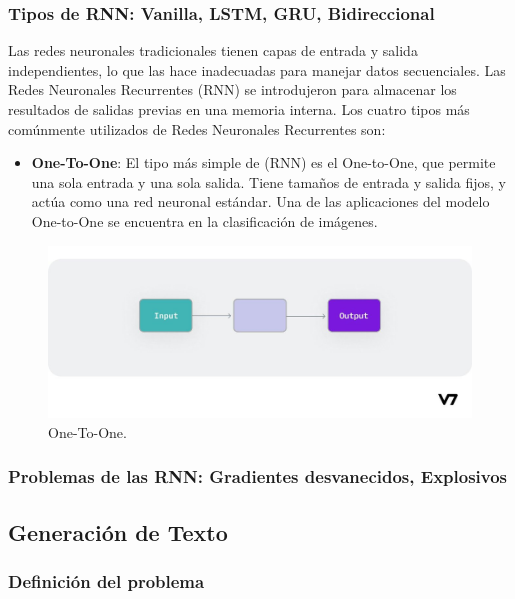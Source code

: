 \documentclass{article}
\begin{document}
\newpage

\subsubsection{Tipos de RNN: Vanilla, LSTM, GRU, Bidireccional}
Las redes neuronales tradicionales tienen capas de entrada y salida independientes, lo que las hace inadecuadas para manejar datos secuenciales.
Las Redes Neuronales Recurrentes (RNN) se introdujeron para almacenar los resultados de salidas previas en una memoria interna.
Los cuatro tipos más comúnmente utilizados de Redes Neuronales Recurrentes son:

\begin{itemize}
    \item \textbf{One-To-One}: El tipo más simple de (RNN) es el One-to-One, que permite una sola entrada y una sola salida. Tiene tamaños de entrada y salida fijos, y actúa como una red neuronal estándar. Una de las aplicaciones del modelo One-to-One se encuentra en la clasificación de imágenes.
\end{itemize}

\begin{figure}[H]
    \centering
    \includegraphics[scale=0.25]{oto.jpeg}
    \caption{One-To-One.}
\end{figure}


\newpage
\subsubsection{Problemas de las RNN: Gradientes desvanecidos, Explosivos}

\subsection{Generación de Texto}
\subsubsection{Definición del problema}
\end{document}
